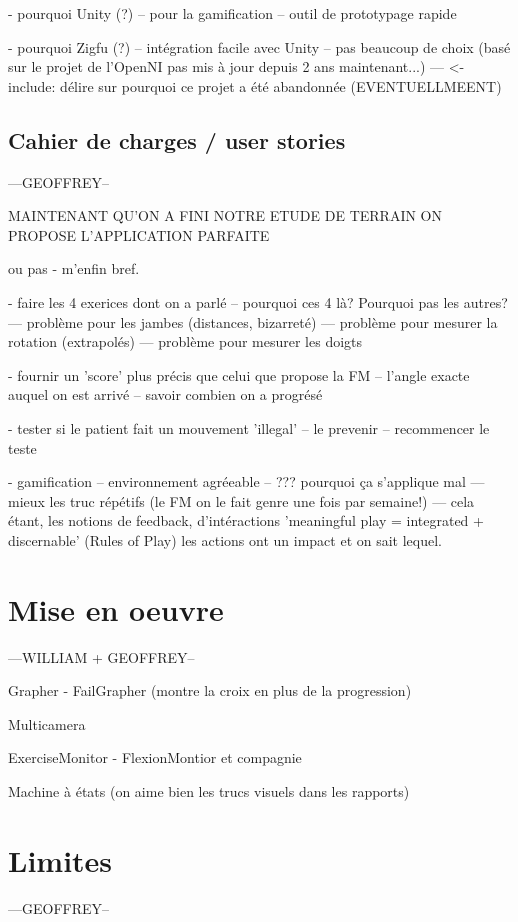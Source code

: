 \documentclass[french,12pt]{report}
\begin{document}
		- pourquoi Unity (?)
		-- pour la gamification
		-- outil de prototypage rapide
		
		- pourquoi Zigfu (?)
		-- intégration facile avec Unity
		-- pas beaucoup de choix (basé sur le projet de l'OpenNI pas mis à jour depuis 2 ans maintenant...)
		--- <- include: délire sur pourquoi ce projet a été abandonnée (EVENTUELLMEENT)
		
		
		\subsection{Cahier de charges / user stories} 		---GEOFFREY--
		
		MAINTENANT QU'ON A FINI NOTRE ETUDE DE TERRAIN ON PROPOSE L'APPLICATION PARFAITE 
		
		ou pas - m'enfin bref.
		
		- faire les 4 exerices dont on a parlé
		-- pourquoi ces 4 là? Pourquoi pas les autres?
		--- problème pour les jambes (distances, bizarreté)
		--- problème pour mesurer la rotation (extrapolés)
		--- problème pour mesurer les doigts 
		
		- fournir un 'score' plus précis que celui que propose la FM
		-- l'angle exacte auquel on est arrivé
		-- savoir combien on a progrésé
		
		- tester si le patient fait un mouvement 'illegal'
		-- le prevenir
		-- recommencer le teste
		
		
		- gamification
		-- environnement agréeable
		-- ??? pourquoi ça s'applique mal
		--- mieux les truc répétifs (le FM on le fait genre une fois par semaine!)
		--- cela étant, les notions de feedback, d'intéractions 
			'meaningful play = integrated + discernable' (Rules of Play) les actions ont un 
			impact et on sait lequel. 
		
		\section{Mise en oeuvre} 		---WILLIAM + GEOFFREY--

		Grapher
		- FailGrapher (montre la croix en plus de la progression)
		
		Multicamera
		
		ExerciseMonitor
		- FlexionMontior et compagnie
		
		Machine à états (on aime bien les trucs visuels dans les rapports)
		
		\section{Limites}		---GEOFFREY--
		
\end{document}
